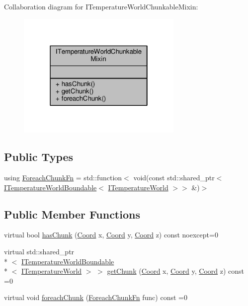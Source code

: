 Collaboration diagram for I\-Temperature\-World\-Chunkable\-Mixin\-:
\nopagebreak
\begin{figure}[H]
\begin{center}
\leavevmode
\includegraphics[width=226pt]{class_i_temperature_world_chunkable_mixin__coll__graph}
\end{center}
\end{figure}
\subsection*{Public Types}
\begin{DoxyCompactItemize}
\item 
using \hyperlink{class_i_temperature_world_chunkable_mixin_abad666f407110d3370328bf97335c8be}{Foreach\-Chunk\-Fn} = std\-::function$<$ void(const std\-::shared\-\_\-ptr$<$ \hyperlink{class_i_temperature_world_boundable}{I\-Temperature\-World\-Boundable}$<$ \hyperlink{class_i_temperature_world}{I\-Temperature\-World} $>$$>$ \&)$>$
\end{DoxyCompactItemize}
\subsection*{Public Member Functions}
\begin{DoxyCompactItemize}
\item 
virtual bool \hyperlink{class_i_temperature_world_chunkable_mixin_a4694b473f4e20976b8a538d16656943d}{has\-Chunk} (\hyperlink{struct_coord}{Coord} x, \hyperlink{struct_coord}{Coord} y, \hyperlink{struct_coord}{Coord} z) const noexcept=0
\item 
virtual std\-::shared\-\_\-ptr\\*
$<$ \hyperlink{class_i_temperature_world_boundable}{I\-Temperature\-World\-Boundable}\\*
$<$ \hyperlink{class_i_temperature_world}{I\-Temperature\-World} $>$ $>$ \hyperlink{class_i_temperature_world_chunkable_mixin_aacb0fa709dbd3cb5d630dde64afec5b6}{get\-Chunk} (\hyperlink{struct_coord}{Coord} x, \hyperlink{struct_coord}{Coord} y, \hyperlink{struct_coord}{Coord} z) const =0
\item 
virtual void \hyperlink{class_i_temperature_world_chunkable_mixin_a2ded37900a83bdac968ff0f07f315225}{foreach\-Chunk} (\hyperlink{class_i_temperature_world_chunkable_mixin_abad666f407110d3370328bf97335c8be}{Foreach\-Chunk\-Fn} func) const =0
\end{DoxyCompactItemize}


